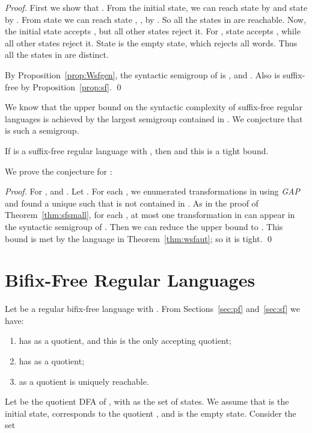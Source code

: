 \documentclass{llncs}
\newcommand{\be}{\begin{enumerate}}
\newcommand{\ee}{\end{enumerate}}
\begin{document}
\begin{proof}
First we show that . From the initial state, we can reach state  by  and state  by . From state  we can reach state , , by . So all the states in  are reachable. Now, the initial state accepts , but all other states reject it. For , state  accepts , while all other states reject it. State  is the empty state, which rejects all words. Thus all the states in  are distinct. 

By Proposition~\ref{prop:Wsfgen}, the syntactic semigroup of  is , and . Also  is suffix-free by Proposition~\ref{prop:sf}. \qed
\end{proof}


We know that the upper bound on the  syntactic complexity of suffix-free regular languages is achieved by the largest semigroup contained in . We conjecture that  is such a semigroup. 
\medskip

\begin{conjecture}
\label{con:sf}
If  is a suffix-free regular language with , then  and this is a tight bound. 
\end{conjecture}



We prove the conjecture for :

\begin{proof} 
For ,   and . Let . For each , we enumerated transformations in  using \emph{GAP} and found a unique  such that  is not contained in . As in the proof of Theorem~\ref{thm:sfsmall}, for each , at most one transformation in  can appear in the syntactic semigroup of . Then we can reduce the upper bound to . This bound is met by the language  in Theorem~\ref{thm:wsfaut}; so it is tight. \qed
\end{proof}



\section{Bifix-Free Regular Languages}\label{sec:bf}


Let  be a regular bifix-free language with . From Sections~\ref{sec:pf} and~\ref{sec:sf} we have: 
\be
\item  has  as a quotient, and this is the only accepting quotient; 
\item  has  as a quotient; 
\item  as a quotient is uniquely reachable.
\ee

Let  be the quotient DFA of , with  as the set of states. We assume that  is the initial state,  corresponds to the quotient , and  is the empty state. Consider the set
\end{document}
